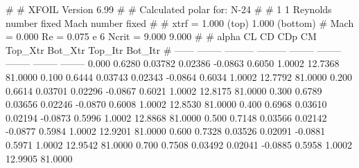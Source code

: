 #  
#       XFOIL         Version 6.99
#  
# Calculated polar for: N-24                                            
#  
# 1 1 Reynolds number fixed          Mach number fixed         
#  
# xtrf =   1.000 (top)        1.000 (bottom)  
# Mach =   0.000     Re =     0.075 e 6     Ncrit =   9.000  9.000
#  
#   alpha    CL        CD       CDp       CM     Top_Xtr  Bot_Xtr  Top_Itr  Bot_Itr
#  ------ -------- --------- --------- -------- -------- -------- -------- --------
   0.000   0.6280   0.03782   0.02386  -0.0863   0.6050   1.0002  12.7368  81.0000
   0.100   0.6444   0.03743   0.02343  -0.0864   0.6034   1.0002  12.7792  81.0000
   0.200   0.6614   0.03701   0.02296  -0.0867   0.6021   1.0002  12.8175  81.0000
   0.300   0.6789   0.03656   0.02246  -0.0870   0.6008   1.0002  12.8530  81.0000
   0.400   0.6968   0.03610   0.02194  -0.0873   0.5996   1.0002  12.8868  81.0000
   0.500   0.7148   0.03566   0.02142  -0.0877   0.5984   1.0002  12.9201  81.0000
   0.600   0.7328   0.03526   0.02091  -0.0881   0.5971   1.0002  12.9542  81.0000
   0.700   0.7508   0.03492   0.02041  -0.0885   0.5958   1.0002  12.9905  81.0000
